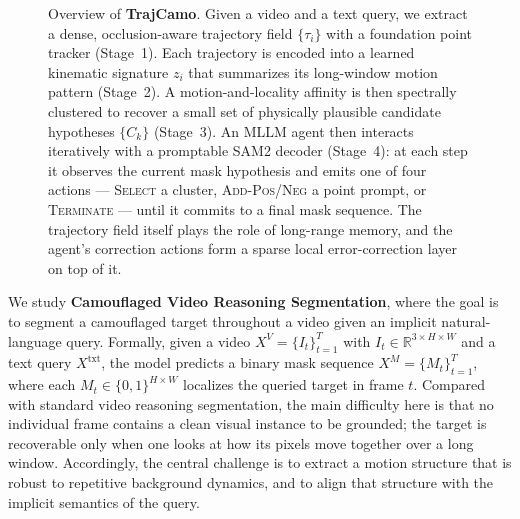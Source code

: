 \documentclass[11pt]{article}
\begin{document}
\begin{figure}[t]
{%
}
\caption{Overview of \textbf{TrajCamo}. Given a video and a text query, we extract a dense, occlusion-aware trajectory field $\{\tau_i\}$ with a foundation point tracker (Stage~1). Each trajectory is encoded into a learned kinematic signature $z_i$ that summarizes its long-window motion pattern (Stage~2). A motion-and-locality affinity is then spectrally clustered to recover a small set of physically plausible candidate hypotheses $\{C_k\}$ (Stage~3). An MLLM agent then interacts iteratively with a promptable SAM2 decoder (Stage~4): at each step it observes the current mask hypothesis and emits one of four actions --- \textsc{Select} a cluster, \textsc{Add-Pos}/\textsc{Neg} a point prompt, or \textsc{Terminate} --- until it commits to a final mask sequence. The trajectory field itself plays the role of long-range memory, and the agent's correction actions form a sparse local error-correction layer on top of it.}
\label{fig:framework}
\end{figure}

We study \textbf{Camouflaged Video Reasoning Segmentation}, where the goal is to segment a camouflaged target throughout a video given an implicit natural-language query.
Formally, given a video $X^{V}=\{I_t\}_{t=1}^{T}$ with $I_t\in\mathbb{R}^{3\times H\times W}$ and a text query $X^{\mathrm{txt}}$, the model predicts a binary mask sequence $X^{M}=\{M_t\}_{t=1}^{T}$, where each $M_t\in\{0,1\}^{H\times W}$ localizes the queried target in frame $t$.
Compared with standard video reasoning segmentation, the main difficulty here is that no individual frame contains a clean visual instance to be grounded; the target is recoverable only when one looks at how its pixels move together over a long window.
Accordingly, the central challenge is to extract a motion structure that is robust to repetitive background dynamics, and to align that structure with the implicit semantics of the query.
\end{document}
